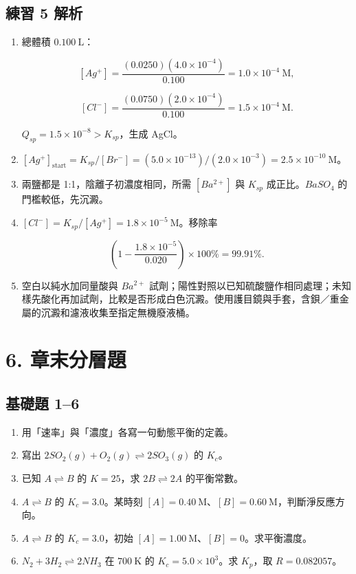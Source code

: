\documentclass[11pt,a4paper]{article}
\providecommand{\tightlist}{%
  \setlength{\itemsep}{0pt}\setlength{\parskip}{0pt}}
\begin{document}
\subsection{練習 5 解析}\label{ux7df4ux7fd2-5-ux89e3ux6790}

\begin{enumerate}
\def\labelenumi{\arabic{enumi}.}
\item
  總體積 \(0.100\ \mathrm L\)：

  \[
  [Ag^+]=\frac{(0.0250)(4.0\times10^{-4})}{0.100}=1.0\times10^{-4}\ \mathrm M,
  \]

  \[
  [Cl^-]=\frac{(0.0750)(2.0\times10^{-4})}{0.100}=1.5\times10^{-4}\ \mathrm M.
  \]

  \(Q_{sp}=1.5\times10^{-8}>K_{sp}\)，生成 AgCl。
\item
  \([Ag^+]_{\mathrm{start}}=K_{sp}/[Br^-]=(5.0\times10^{-13})/(2.0\times10^{-3})=2.5\times10^{-10}\ \mathrm M\)。
\item
  兩鹽都是 1:1，陰離子初濃度相同，所需 \([Ba^{2+}]\) 與 \(K_{sp}\) 成正比。\(BaSO_4\) 的門檻較低，先沉澱。
\item
  \([Cl^-]=K_{sp}/[Ag^+]=1.8\times10^{-5}\ \mathrm M\)。移除率

  \[
  \left(1-\frac{1.8\times10^{-5}}{0.020}\right)\times100\%=99.91\%.
  \]
\item
  空白以純水加同量酸與 \(Ba^{2+}\) 試劑；陽性對照以已知硫酸鹽作相同處理；未知樣先酸化再加試劑，比較是否形成白色沉澱。使用護目鏡與手套，含鋇／重金屬的沉澱和濾液收集至指定無機廢液桶。
\end{enumerate}

\section{6. 章末分層題}\label{ux7ae0ux672bux5206ux5c64ux984c}

\subsection{基礎題 1--6}\label{ux57faux790eux984c-16}

\begin{enumerate}
\def\labelenumi{\arabic{enumi}.}
\tightlist
\item
  用「速率」與「濃度」各寫一句動態平衡的定義。
\item
  寫出 \(2SO_2(g)+O_2(g)\rightleftharpoons2SO_3(g)\) 的 \(K_c\)。
\item
  已知 \(A\rightleftharpoons B\) 的 \(K=25\)，求 \(2B\rightleftharpoons2A\) 的平衡常數。
\item
  \(A\rightleftharpoons B\) 的 \(K_c=3.0\)。某時刻 \([A]=0.40\ \mathrm M\)、\([B]=0.60\ \mathrm M\)，判斷淨反應方向。
\item
  \(A\rightleftharpoons B\) 的 \(K_c=3.0\)，初始 \([A]=1.00\ \mathrm M\)、\([B]=0\)。求平衡濃度。
\item
  \(N_2+3H_2\rightleftharpoons2NH_3\) 在 \(700\ \mathrm K\) 的 \(K_c=5.0\times10^3\)。求 \(K_p\)，取 \(R=0.082057\)。
\end{enumerate}
\end{document}
